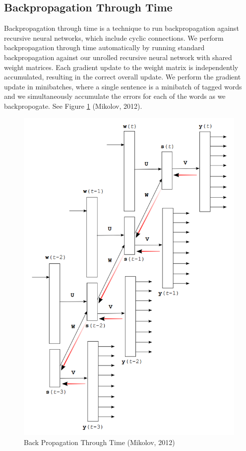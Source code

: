 \documentclass[11pt]{article}
\begin{document}
\subsection{Backpropagation Through Time}

Backpropagation through time is a technique to run backpropagation against recursive neural networks, which include cyclic connections. We perform backpropagation through time automatically by running standard backpropagation against our unrolled recursive neural network with shared weight matrices. Each gradient update to the weight matrix is independently accumulated, resulting in the correct overall update. We perform the gradient update in minibatches, where a single sentence is a minibatch of tagged words and we simultaneously accumulate the errors for each of the words as we backpropogate. See Figure \ref{Bptt_fig} (Mikolov, 2012).

\begin{figure}
	\includegraphics[scale=0.5]{bptt.png}
	\caption{Back Propagation Through Time (Mikolov, 2012)}\label{Bptt_fig}
\end{figure}
\end{document}
